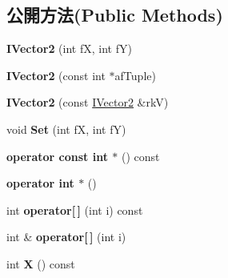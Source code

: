 \subsection*{公開方法(Public Methods)}
\begin{DoxyCompactItemize}
\item 
{\bfseries I\+Vector2} (int fX, int fY)\hypertarget{class_magnum_1_1_i_vector2_a6debaed533ef943026b1d5be0940b0ec}{}\label{class_magnum_1_1_i_vector2_a6debaed533ef943026b1d5be0940b0ec}

\item 
{\bfseries I\+Vector2} (const int $\ast$af\+Tuple)\hypertarget{class_magnum_1_1_i_vector2_a19343b1ef8fecb8b15e6b6491718997d}{}\label{class_magnum_1_1_i_vector2_a19343b1ef8fecb8b15e6b6491718997d}

\item 
{\bfseries I\+Vector2} (const \hyperlink{class_magnum_1_1_i_vector2}{I\+Vector2} \&rkV)\hypertarget{class_magnum_1_1_i_vector2_a6cd31b7a563ee01db5ec1e7539147fc9}{}\label{class_magnum_1_1_i_vector2_a6cd31b7a563ee01db5ec1e7539147fc9}

\item 
void {\bfseries Set} (int fX, int fY)\hypertarget{class_magnum_1_1_i_vector2_a915c44d87fd1ba082a711ab7b05d419c}{}\label{class_magnum_1_1_i_vector2_a915c44d87fd1ba082a711ab7b05d419c}

\item 
{\bfseries operator const int $\ast$} () const \hypertarget{class_magnum_1_1_i_vector2_ad059c7bee8ef5503b2fbd49adb703aab}{}\label{class_magnum_1_1_i_vector2_ad059c7bee8ef5503b2fbd49adb703aab}

\item 
{\bfseries operator int $\ast$} ()\hypertarget{class_magnum_1_1_i_vector2_a5b71e5aecd81352ce4f9f50b16f48a41}{}\label{class_magnum_1_1_i_vector2_a5b71e5aecd81352ce4f9f50b16f48a41}

\item 
int {\bfseries operator\mbox{[}$\,$\mbox{]}} (int i) const \hypertarget{class_magnum_1_1_i_vector2_ac88d6751aa43747482661eabfbd1068b}{}\label{class_magnum_1_1_i_vector2_ac88d6751aa43747482661eabfbd1068b}

\item 
int \& {\bfseries operator\mbox{[}$\,$\mbox{]}} (int i)\hypertarget{class_magnum_1_1_i_vector2_a697a8fe44e5dd45a82876bfc1c04c847}{}\label{class_magnum_1_1_i_vector2_a697a8fe44e5dd45a82876bfc1c04c847}

\item 
int {\bfseries X} () const \hypertarget{class_magnum_1_1_i_vector2_a3494f87ff1f286c0aea673d270eb5ece}{}\label{class_magnum_1_1_i_vector2_a3494f87ff1f286c0aea673d270eb5ece}


\end{DoxyCompactItemize}
